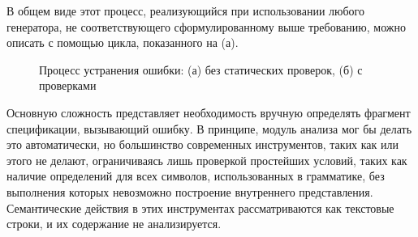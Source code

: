 В общем виде этот процесс, реализующийся при использовании любого генератора, не соответствующего сформулированному выше требованию, можно описать с помощью цикла, показанного на  (а).
\begin{figure}[htbp]
\centering
{}
\caption{Процесс устранения ошибки: (а) без статических проверок, (б) с проверками}\label{cycles}
\end{figure}
Основную сложность представляет необходимость вручную определять фрагмент спецификации, вызывающий ошибку. В принципе, модуль анализа мог бы делать это автоматически, но большинство современных инструментов, таких как  или  этого не делают, ограничиваясь лишь проверкой простейших условий, таких как наличие определений для всех символов, использованных в грамматике, без выполнения которых невозможно построение внутреннего представления. Семантические действия в этих инструментах рассматриваются как текстовые строки, и их содержание не анализируется.

